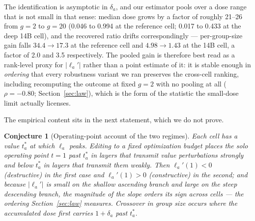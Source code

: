 \documentclass[preprint,12pt]{elsarticle}
\newtheorem{conjecture}{Conjecture}
\theoremstyle{definition}
\begin{document}
The identification is asymptotic in $\delta_a$, and our estimator pools over a dose range
that is not small in that sense: median dose grows by a factor of roughly 21--26 from
$g{=}2$ to $g{=}20$ (0.046 to 0.994 at the reference cell; 0.017 to 0.433 at the deep 14B
cell), and the recovered ratio drifts correspondingly --- per-group-size gain falls
$34.4\to17.3$ at the reference cell and $4.98\to1.43$ at the 14B cell, a factor of 2.0
and 3.5 respectively. The pooled gain is therefore best read as a rank-level proxy for
$|\ell_a'|$ rather than a point estimate of it: it is stable enough in \emph{ordering}
that every robustness variant we ran preserves the cross-cell ranking, including
recomputing the outcome at fixed $g{=}2$ with no pooling at all
($\rho=-0.80$; Section~\ref{sec:law}), which is the form of the statistic the
small-dose limit actually licenses.

The empirical content sits in the next statement, which we do not prove.

\begin{conjecture}[Operating-point account of the two regimes]\label{conj:opt}
Each cell has a value $t^{*}_a$ at which $\ell_a$ peaks. Editing to a fixed optimization
budget places the solo operating point $t{=}1$ \emph{past} $t^{*}_a$ in layers that
transmit value perturbations strongly and \emph{below} $t^{*}_a$ in layers that transmit
them weakly. Then $\ell_a'(1)<0$ (destructive) in the first case and $\ell_a'(1)>0$
(constructive) in the second; and because $|\ell_a'|$ is small on the shallow ascending
branch and large on the steep descending branch, the magnitude of the slope orders its
sign across cells --- the ordering Section~\ref{sec:law} measures. Crossover in group
size occurs where the accumulated dose first carries $1+\delta_a$ past $t^{*}_a$.
\end{conjecture}
\end{document}
